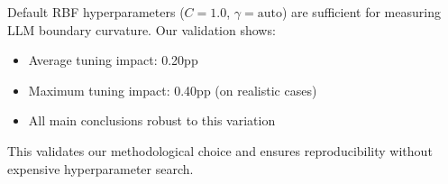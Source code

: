 \documentclass[11pt]{article}
\begin{document}
Default RBF hyperparameters ($C=1.0$, $\gamma=\text{auto}$) are sufficient for measuring LLM boundary curvature. Our validation shows:
\begin{itemize}
    \item Average tuning impact: 0.20pp
    \item Maximum tuning impact: 0.40pp (on realistic cases)
    \item All main conclusions robust to this variation
\end{itemize}

This validates our methodological choice and ensures reproducibility without expensive hyperparameter search.



\end{document}
